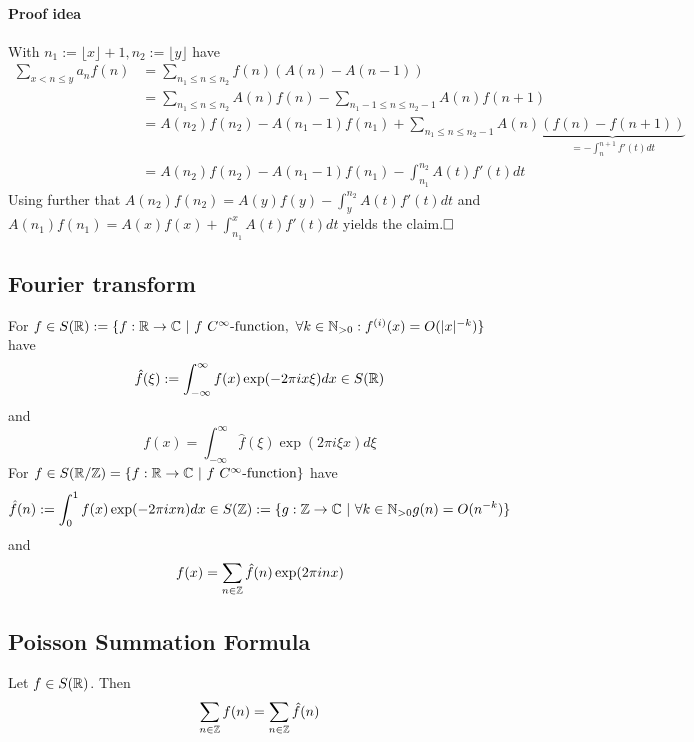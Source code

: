 \paragraph{Proof idea} With $n_1 := \lfloor x \rfloor + 1, n_2 := \lfloor y \rfloor$ have
\begin{align*}
    \sum_{x < n \leq y} a_n f(n) &= \sum_{n_1 \leq n \leq n_2} f(n)(A(n) - A(n - 1)) \\
    &= \sum_{n_1 \leq n \leq n_2} A(n) f(n) - \sum_{n_1 - 1 \leq n \leq n_2 - 1} A(n) f(n + 1) \\
    &= A(n_2) f(n_2) - A(n_1 - 1) f(n_1) + \sum_{n_1 \leq n \leq n_2 - 1} A(n) \underbrace{(f(n) - f(n + 1))}_{= -\int_n^{n+1} f'(t) dt} \\
    &= A(n_2) f(n_2) - A(n_1 - 1) f(n_1) - \int_{n_1}^{n_2} A(t) f'(t) dt
\end{align*}
Using further that $A(n_2) f(n_2) = A(y) f(y) - \int_y^{n_2} A(t) f'(t) dt$ and $A(n_1) f(n_1) = A(x) f(x) + \int_{n_1}^x A(t) f'(t) dt$ yields the claim.$\hfill\square$

\subsection{Fourier transform}
For $f \in S(\mathbb{R}) := \{ f: \mathbb{R} \to \mathbb{C} \ | \ f \ \text{$C^\infty$-function}, \ \forall k \in \mathbb{N}_{> 0}: f^{(i)}(x) = O(|x|^{-k}) \}$ have
\begin{equation*}
    \hat{f}(\xi) := \int_{-\infty}^{\infty} f(x) \exp(-2\pi i x \xi) dx \in S(\mathbb{R})
\end{equation*}
and
\begin{equation*}
    f(x) = \int_{-\infty}^{\infty} \hat{f}(\xi) \exp(2\pi i \xi x) d\xi
\end{equation*}
For $f \in S(\mathbb{R}/\mathbb{Z}) = \{ f: \mathbb{R} \to \mathbb{C} \ | \ f \ \text{$C^\infty$-function}\}$ have
\begin{equation*}
    \hat{f}(n) := \int_0^1 f(x) \exp(-2\pi i x n) dx \in S(\mathbb{Z}) := \{ g: \mathbb{Z} \to \mathbb{C} \ | \ \forall k \in \mathbb{N}_{> 0} g(n) = O(n^{-k})\}
\end{equation*}
and
\begin{equation*}
    f(x) = \sum_{n \in \mathbb{Z}} \hat{f}(n) \exp(2\pi i n x)
\end{equation*}

\subsection{Poisson Summation Formula}
Let $f \in S(\mathbb{R})$. Then
\begin{equation*}
    \sum_{n \in \mathbb{Z}} f(n) = \sum_{n \in \mathbb{Z}} \hat{f}(n)
\end{equation*}

